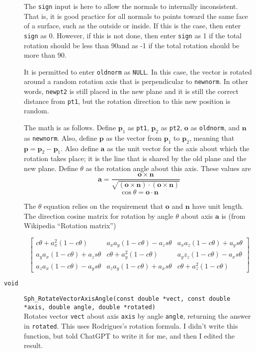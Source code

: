 \documentclass[11pt]{article}
\newcommand {\ttt} {\texttt}
\begin{document}
\begin{description}
The \ttt{sign} input is here to allow the normals to internally inconsistent. That is, it is good practice for all normals to points toward the same face of a surface, such as the outside or inside. If this is the case, then enter \ttt{sign} as 0. However, if this is not done, then enter \ttt{sign} as 1 if the total rotation should be less than 90\degree and as -1 if the total rotation should be more than 90\degree.

It is permitted to enter \ttt{oldnorm} as \ttt{NULL}. In this case, the vector is rotated around a random rotation axis that is perpendicular to \ttt{newnorm}. In other words, \ttt{newpt2} is still placed in the new plane and it is still the correct distance from \ttt{pt1}, but the rotation direction to this new position is random.

The math is as follows. Define $\bm{p}_1$ as \ttt{pt1}, $\bm{p}_2$ as \ttt{pt2}, $\bm{o}$ as \ttt{oldnorm}, and $\bm{n}$ as \ttt{newnorm}. Also, define $\bm{p}$ as the vector from $\bm{p}_1$ to $\bm{p}_2$, meaning that $\bm{p} = \bm{p}_2 - \bm{p}_1$. Also define $\bm{a}$ as the unit vector for the axis about which the rotation takes place; it is the line that is shared by the old plane and the new plane. Define $\theta$ as the rotation angle about this axis. These values are
$$\bm{a} = \frac{\bm{o} \times \bm{n}}{\sqrt{(\bm{o} \times \bm{n})\cdot (\bm{o} \times \bm{n})}}$$
$$\cos \theta = \bm{o} \cdot \bm{n}$$

The $\theta$ equation relies on the requirement that $\bm{o}$ and $\bm{n}$ have unit length. The direction cosine matrix for rotation by angle $\theta$ about axis $\bm{a}$ is (from Wikipedia ``Rotation matrix'')

$$\left[ \begin{array}{ccc}
c\theta+ a_x^2(1-c\theta) & a_x a_y(1-c\theta)-a_z s\theta & a_x a_z (1-c\theta)+a_y s\theta \\
a_y a_x(1-c\theta)+a_zs\theta & c\theta + a_y^2(1-c\theta) & a_y z_z(1-c\theta)-a_x s\theta \\
a_z a_x(1-c\theta)-a_y s\theta & a_z a_y(1-c\theta) + a_x s\theta & c\theta + a_z^2(1-c\theta)
\end{array} \right ]$$


\item[\ttt{void}]
\ttt{Sph\_RotateVectorAxisAngle(const double *vect, const double *axis, double angle, double *rotated)}
\hfill \\
Rotates vector \ttt{vect} about axis \ttt{axis} by angle \ttt{angle}, returning the answer in \ttt{rotated}. This uses Rodrigues's rotation formula. I didn't write this function, but told ChatGPT to write it for me, and then I edited the result.

\end{description}



\end{document}
